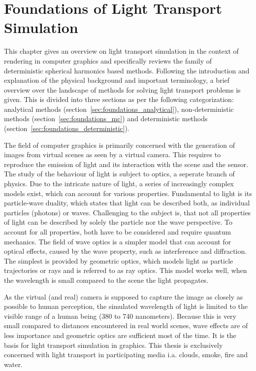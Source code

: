 \chapter{Foundations of Light Transport Simulation}
\label{sec:foundations}

This chapter gives an overview on light transport simulation in the context of rendering in computer graphics and specifically reviews the family of deterministic spherical harmonics based methods. Following the introduction and explanation of the physical background and important terminology, a brief overview over the landscape of methods for solving light transport problems is given. This is divided into three sections as per the following categorization: analytical methods (section~\ref{sec:foundations_analytical}), non-deterministic methods (section~\ref{sec:foundations_mc}) and deterministic methods (section~\ref{sec:foundations_deterministic}).

The field of computer graphics is primarily concerned with the generation of images from virtual scenes as seen by a virtual camera. This requires to reproduce the emission of light and its interaction with the scene and the sensor. The study of the behaviour of light is subject to optics, a seperate branch of physics. Due to the intricate nature of light, a series of increasingly complex models exist, which can account for various properties. Fundamental to light is its particle-wave duality, which states that light can be described both, as individual particles (photons) or waves. Challenging to the subject is, that not all properties of light can be described by solely the particle nor the wave perspective. To account for all properties, both have to be considered and require quantum mechanics. The field of wave optics is a simpler model that can account for optical effects, caused by the wave property, such as interference and diffraction. The simplest is provided by geometric optics, which models light as particle trajectories or rays and is referred to as ray optics. This model works well, when the wavelength is small compared to the scene the light propagates. 

As the virtual (and real) camera is supposed to capture the image as closely as possible to human perception, the simulated wavelength of light is limited to the visible range of a human being (380 to 740 nanometers). Because this is very small compared to distances encountered in real world scenes, wave effects are of less importance and geometric optics are sufficient most of the time. It is the basis for light transport simulation in graphics. This thesis is exclusively concerned with light transport in participating media i.a. clouds, smoke, fire and water.



